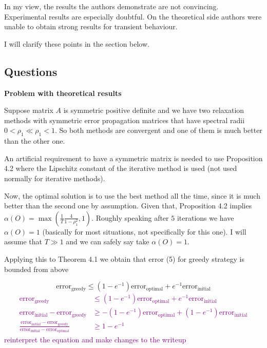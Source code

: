\documentclass[12pt]{article}
\begin{document}
In my view, the results the authors demonstrate are not convincing. Experimental results are especially doubtful. On the theoretical side authors were unable to obtain strong results for transient behaviour.

I will clarify these points in the section below.

\subsection*{Questions}

\textbf{Problem with theoretical results}

Suppose matrix $A$ is symmetric positive definite and we have two relaxation methods with symmetric error propagation matrices that have spectral radii $0 < \rho_1 \ll \rho_1 < 1$. So both methods are convergent and one of them is much better than the other one.

An artificial requirement to have a symmetric matrix is needed to use Proposition 4.2 where the Lipschitz constant of the iterative method is used (not used normally for iterative methods).

Now, the optimal solution is to use the best method all the time, since it is much better than the second one by assumption. Given that, Proposition 4.2 implies $\alpha (O) = \max \left(\frac{1}{T}\frac{4}{1 - \rho_1^2}, 1\right)$. Roughly speaking after $5$ iterations we have $\alpha(O) = 1$ (basically for most situations, not specifically for this one). I will assume that $T \gg 1$ and we can safely say take $\alpha(O) = 1$. 

Applying this to Theorem 4.1 we obtain that error (5) for greedy strategy is bounded from above

\begin{equation}
    \text{error}_{\text{greedy}} \leq (1 - e^{-1})\text{error}_{\text{optimal}} + e^{-1}\text{error}_{\text{initial}}
\end{equation}
\textcolor{purple}{
{\color{purple}\begin{align*}
    \text{error}_{\text{greedy}} &\leq (1 - e^{-1})\text{error}_{\text{optimal}} + e^{-1}\text{error}_{\text{initial}} \\
    \text{error}_{\text{initial}}-\text{error}_{\text{greedy}} &\geq -(1 - e^{-1})\text{error}_{\text{optimal}} + (1-e^{-1})\text{error}_{\text{initial}} \\
    \frac{\text{error}_{\text{initial}}-\text{error}_{\text{greedy}}}{\text{error}_{\text{initial}}-\text{error}_{\text{optimal}}} &\geq 1 - e^{-1} 
\end{align*}}
reinterpret the equation and make changes to the writeup}
\end{document}
